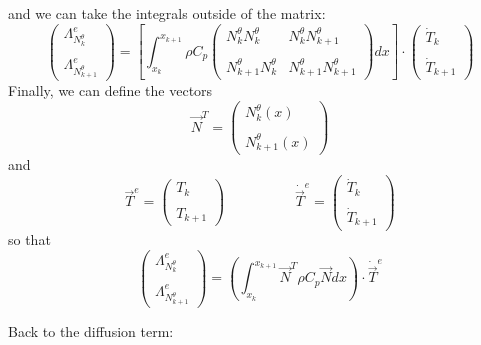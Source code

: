 and we can take the integrals outside of the matrix:
\[
\left(
\begin{array}{c}
{\Lambda}_{N_k^\theta}^e \\ \\ {\Lambda}_{N_{k+1}^\theta}^e
\end{array}
\right)
=
\left[
\int_{x_k}^{x_{k+1}}
\rho C_p
\left(
\begin{array}{cc}
N_k^\theta N_{k}^\theta     &  N_k^\theta N_{k+1}^\theta  \\ \\
N_{k+1}^\theta N_{k}^\theta &  N_{k+1}^\theta N_{k+1}^\theta 
\end{array}
\right)
dx
\right]
\cdot
\left(
\begin{array}{c}
\dot{T}_k \\ \\ 
\dot{T}_{k+1}
\end{array}
\right)
\]
Finally, we can define the vectors 
\[
{\vec N}^T = 
\left(
\begin{array}{c}
N_k^\theta(x)  \\ \\  N_{k+1}^\theta (x)
\end{array}
\right)
\]
and 
\[
{\vec T}^e = 
\left(
\begin{array}{c}
T_k \\ \\ T_{k+1}
\end{array}
\right)
\quad
\quad
\quad
\quad
\quad
\dot{\vec T}^e = 
\left(
\begin{array}{c}
\dot{T}_k \\ \\ \dot{T}_{k+1}
\end{array}
\right)
\]
so that 
\[
\left(
\begin{array}{c}
{\Lambda}_{N_k^\theta}^e \\  \\ {\Lambda}_{N_{k+1}^\theta}^e
\end{array}
\right)
=
\left( \int_{x_k}^{x_{k+1}}   {\vec N}^T \rho C_p  {\vec N} dx  \right) \cdot \dot{\vec T}^e
\]

Back to the diffusion term:

